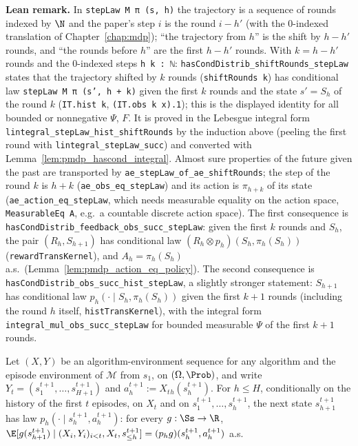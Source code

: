 \textbf{Lean remark.} In \texttt{stepLaw M π (s, h)} the trajectory is a sequence of rounds
indexed by $\N$ and the paper's step $i$ is the round $i - h'$ (with the $0$-indexed
translation of Chapter~\ref{chap:mdp}); ``the trajectory from $h$'' is the shift by $h - h'$
rounds, and ``the rounds before $h$'' are the first $h - h'$ rounds. With $k = h - h'$ rounds
and the $0$-indexed steps \texttt{h k : ℕ}:
\texttt{hasCondDistrib\_shiftRounds\_stepLaw} states that the trajectory shifted by $k$ rounds
(\texttt{shiftRounds k}) has conditional law \texttt{stepLaw M π (s', h + k)} given the first $k$ rounds
and the state $s' = S_h$ of the round $k$ (\texttt{IT.hist k}, \texttt{(IT.obs k x).1}); this is the
displayed identity for all bounded or nonnegative $\Psi$, $F$. It is proved in the Lebesgue integral
form \texttt{lintegral\_stepLaw\_hist\_shiftRounds} by the induction above (peeling the first round
with \texttt{lintegral\_stepLaw\_succ}) and converted with
Lemma~\ref{lem:pmdp_hascond_integral}. Almost sure properties of the future given the past are
transported by \texttt{ae\_stepLaw\_of\_ae\_shiftRounds}; the step of the round $k$ is $h + k$
(\texttt{ae\_obs\_eq\_stepLaw}) and its action is $\pi_{h+k}$ of its state
(\texttt{ae\_action\_eq\_stepLaw}, which needs measurable equality on the action space,
\texttt{MeasurableEq A}, e.g.\ a countable discrete action space). The first consequence is
\texttt{hasCondDistrib\_feedback\_obs\_succ\_stepLaw}: given the first $k$ rounds and $S_h$, the pair
$(R_h, S_{h+1})$ has conditional law $(R_h \otimes p_h)(S_h, \pi_h(S_h))$ (\texttt{rewardTransKernel}),
and $A_h = \pi_h(S_h)$ a.s.\ (Lemma~\ref{lem:pmdp_action_eq_policy}). The second consequence is
\texttt{hasCondDistrib\_obs\_succ\_hist\_stepLaw}, a slightly stronger statement: $S_{h+1}$ has
conditional law $p_h(\cdot \mid S_h, \pi_h(S_h))$ given the first $k + 1$ rounds (including the round
$h$ itself, \texttt{histTransKernel}), with the integral form \texttt{integral\_mul\_obs\_succ\_stepLaw}
for bounded measurable $\Psi$ of the first $k + 1$ rounds.

\begin{lemma}\label{lem:pmdp_episode_env_step}
\leanok
{}
Let $(X, Y)$ be an algorithm-environment sequence for any algorithm and the episode environment
of $\mathcal M$ from $s_1$, on $(\Omega, \Prob)$, and write $Y_t = (s^{t+1}_1, \dots, s^{t+1}_{H+1})$
and $a^{t+1}_h := X_t{}_h(s^{t+1}_h)$. For $h \le H$, conditionally on the history of the first $t$
episodes, on $X_t$ and on $s^{t+1}_1, \dots, s^{t+1}_h$, the next state $s^{t+1}_{h+1}$ has law
$p_h(\cdot \mid s^{t+1}_h, a^{t+1}_h)$: for every $g : \Ss \to \R$,
$\E[g(s^{t+1}_{h+1}) \mid (X_i, Y_i)_{i < t}, X_t, s^{t+1}_{\le h}] = (p_h g)(s^{t+1}_h, a^{t+1}_h)$ a.s.
\end{lemma}

